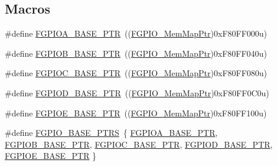 \subsection*{Macros}
\begin{DoxyCompactItemize}
\item 
\#define \hyperlink{group___f_g_p_i_o___peripheral_gab3a191da68ebf432fd4f94966600d287}{F\+G\+P\+I\+O\+A\+\_\+\+B\+A\+S\+E\+\_\+\+P\+TR}~((\hyperlink{group___f_g_p_i_o___peripheral_gaeed3beeb5e5c99ae5b0e404b21466e55}{F\+G\+P\+I\+O\+\_\+\+Mem\+Map\+Ptr})0x\+F80\+F\+F000u)
\item 
\#define \hyperlink{group___f_g_p_i_o___peripheral_gab93f90411688e9bf030a19bda18ba512}{F\+G\+P\+I\+O\+B\+\_\+\+B\+A\+S\+E\+\_\+\+P\+TR}~((\hyperlink{group___f_g_p_i_o___peripheral_gaeed3beeb5e5c99ae5b0e404b21466e55}{F\+G\+P\+I\+O\+\_\+\+Mem\+Map\+Ptr})0x\+F80\+F\+F040u)
\item 
\#define \hyperlink{group___f_g_p_i_o___peripheral_ga6e8da1b292ae2db0692bbb91a63eb0cc}{F\+G\+P\+I\+O\+C\+\_\+\+B\+A\+S\+E\+\_\+\+P\+TR}~((\hyperlink{group___f_g_p_i_o___peripheral_gaeed3beeb5e5c99ae5b0e404b21466e55}{F\+G\+P\+I\+O\+\_\+\+Mem\+Map\+Ptr})0x\+F80\+F\+F080u)
\item 
\#define \hyperlink{group___f_g_p_i_o___peripheral_ga9c6c1b7ee627c12dd837efcb09e23d15}{F\+G\+P\+I\+O\+D\+\_\+\+B\+A\+S\+E\+\_\+\+P\+TR}~((\hyperlink{group___f_g_p_i_o___peripheral_gaeed3beeb5e5c99ae5b0e404b21466e55}{F\+G\+P\+I\+O\+\_\+\+Mem\+Map\+Ptr})0x\+F80\+F\+F0\+C0u)
\item 
\#define \hyperlink{group___f_g_p_i_o___peripheral_ga07d1ba914f3ded63431edec77d4544ee}{F\+G\+P\+I\+O\+E\+\_\+\+B\+A\+S\+E\+\_\+\+P\+TR}~((\hyperlink{group___f_g_p_i_o___peripheral_gaeed3beeb5e5c99ae5b0e404b21466e55}{F\+G\+P\+I\+O\+\_\+\+Mem\+Map\+Ptr})0x\+F80\+F\+F100u)
\item 
\#define \hyperlink{group___f_g_p_i_o___peripheral_ga58956e4d0a0ffec3e1dd70e77a5160b4}{F\+G\+P\+I\+O\+\_\+\+B\+A\+S\+E\+\_\+\+P\+T\+RS}~\{ \hyperlink{group___f_g_p_i_o___peripheral_gab3a191da68ebf432fd4f94966600d287}{F\+G\+P\+I\+O\+A\+\_\+\+B\+A\+S\+E\+\_\+\+P\+TR}, \hyperlink{group___f_g_p_i_o___peripheral_gab93f90411688e9bf030a19bda18ba512}{F\+G\+P\+I\+O\+B\+\_\+\+B\+A\+S\+E\+\_\+\+P\+TR}, \hyperlink{group___f_g_p_i_o___peripheral_ga6e8da1b292ae2db0692bbb91a63eb0cc}{F\+G\+P\+I\+O\+C\+\_\+\+B\+A\+S\+E\+\_\+\+P\+TR}, \hyperlink{group___f_g_p_i_o___peripheral_ga9c6c1b7ee627c12dd837efcb09e23d15}{F\+G\+P\+I\+O\+D\+\_\+\+B\+A\+S\+E\+\_\+\+P\+TR}, \hyperlink{group___f_g_p_i_o___peripheral_ga07d1ba914f3ded63431edec77d4544ee}{F\+G\+P\+I\+O\+E\+\_\+\+B\+A\+S\+E\+\_\+\+P\+TR} \}
\end{DoxyCompactItemize}
